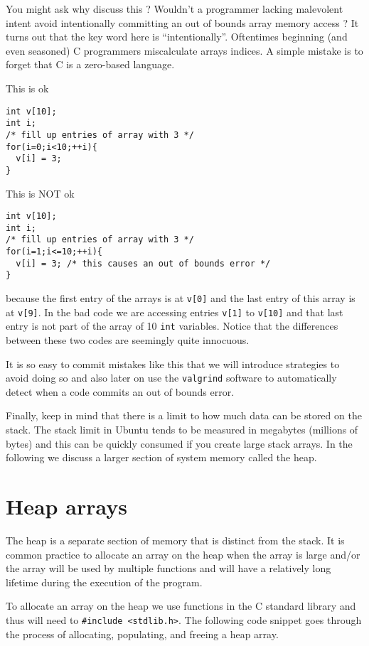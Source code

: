 You might ask why discuss this ? Wouldn't a programmer lacking malevolent intent avoid intentionally committing an out of bounds array memory access ? It turns out that the key word here is ``intentionally''. Oftentimes beginning (and even seasoned) C programmers miscalculate arrays indices. A simple mistake is to forget that C is a zero-based language. 

This is ok
\begin{verbatim}
int v[10];
int i;
/* fill up entries of array with 3 */
for(i=0;i<10;++i){
  v[i] = 3;
}
\end{verbatim}

This is NOT ok 
\begin{verbatim}
int v[10];
int i;
/* fill up entries of array with 3 */
for(i=1;i<=10;++i){
  v[i] = 3; /* this causes an out of bounds error */
}
\end{verbatim}
because the first entry of the arrays is at \texttt{v[0]} and the last entry of this array is at \texttt{v[9]}. In the bad code we are accessing entries \texttt{v[1]} to \texttt{v[10]} and that last entry is not part of the array of 10 \texttt{int} variables. Notice that the differences between these two codes are seemingly quite innocuous.

It is so easy to commit mistakes like this that we will introduce strategies to avoid doing so and also later on use the \texttt{valgrind} software to automatically detect when a code commits an out of bounds error.

Finally, keep in mind that there is a limit to how much data can be stored on the stack. The stack limit in Ubuntu tends to be measured in megabytes (millions of bytes) and this can be quickly consumed if you create large stack arrays. In the following we discuss a larger section of system memory called the heap.

\section{Heap arrays}
The heap is a separate section of memory that is distinct from the stack. It is common practice to allocate an array on the heap when the array is large and/or the array will be used by multiple functions and will have a relatively long lifetime during the execution of the program. 

To allocate an array on the heap we use functions in the C standard library and thus will need to \texttt{\#include <stdlib.h>}. The following code snippet goes through the process of allocating, populating, and freeing a heap array.

